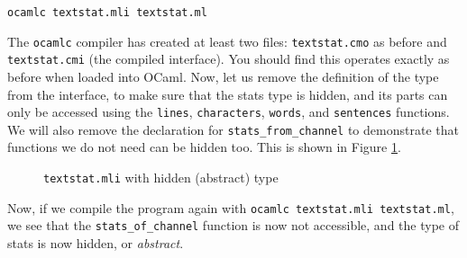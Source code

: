 \documentclass[]{book}
\newcommand{\smspace}{\vspace{4mm}}
\begin{document}
\smspace
\texttt{ocamlc textstat.mli textstat.ml}
\smspace

\noindent The \texttt{ocamlc} compiler has created at least two files: \texttt{textstat.cmo} as before and \texttt{textstat.cmi} (the compiled interface). You should find this operates exactly as before when loaded into OCaml. Now, let us remove the definition of the type from the interface, to make sure that the stats type is hidden, and its parts can only be accessed using the \texttt{lines}, \texttt{characters}, \texttt{words}, and \texttt{sentences} functions. We will also remove the declaration for \texttt{stats\_from\_channel} to demonstrate that functions we do not need can be hidden too. This is shown in Figure \ref{textstat2.mli}.

\begin{figure}
\begin{center}
\end{center}
\caption{\small\texttt{textstat.mli} with hidden (abstract) type}
\label{textstat2.mli}
\end{figure}

Now, if we compile the program again with \texttt{ocamlc\! textstat.mli\! textstat.ml}, we see that the \texttt{stats\_of\_channel} function is now not accessible, and the type of stats is now hidden, or \textit{abstract}.
\end{document}
